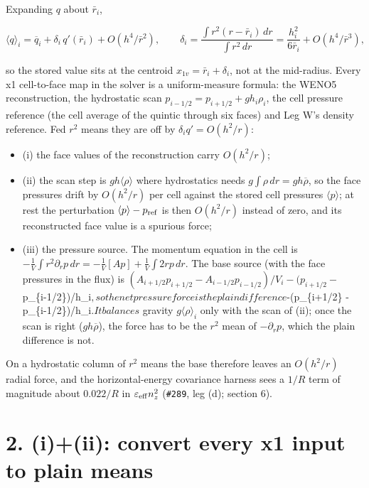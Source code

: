 \documentclass[11pt,a4paper]{article}
\begin{document}
Expanding $q$ about $\bar r_i$,

\begin{equation*}
\langle q\rangle_i = \overline{q}_i + \delta_i\, q'(\bar r_i) + O(h^4/\bar r^2), \qquad
\delta_i = \frac{\int r^2 (r-\bar r_i)\,dr}{\int r^2\,dr} = \frac{h_i^2}{6\bar r_i} + O(h^4/\bar r^3),
\end{equation*}

so the stored value sits at the centroid $x_{1v} = \bar r_i + \delta_i$, not at the mid-radius. Every x1
cell-to-face map in the solver is a uniform-measure formula: the WENO5 reconstruction, the hydrostatic scan
$p_{i-1/2} = p_{i+1/2} + g h_i \rho_i$, the cell pressure reference (the cell average of the quintic through
six faces) and Leg W's density reference. Fed $r^2$ means they are off by $\delta_i q' = O(h^2/r)$:

\begin{itemize}
\item (i) the face values of the reconstruction carry $O(h^2/r)$;
\item (ii) the scan step is $g h\langle\rho\rangle$ where hydrostatics needs $g\int\rho\,dr = g h\overline\rho$, so the
  face pressures drift by $O(h^2/r)$ per cell against the stored cell pressures $\langle p\rangle$; at rest the
  perturbation $\langle p\rangle - p_{\rm ref}$ is then $O(h^2/r)$ instead of zero, and its reconstructed face
  value is a spurious force;
\item (iii) the pressure source. The momentum equation in the cell is
  $-\frac{1}{V}\int r^2 \partial_r p\,dr = -\frac{1}{V}[A p] + \frac{1}{V}\int 2 r p\,dr$. The base source
  (with the face pressures in the flux) is $(A_{i+1/2}p_{i+1/2} - A_{i-1/2}p_{i-1/2})/V_i - (p_{i+1/2} -$
  p\_\{i-1/2\})/h\_i$, so the net pressure force is the plain difference $-(p\_\{i+1/2\} - p\_\{i-1/2\})/h\_i$. It balances$
  gravity $g\langle\rho\rangle_i$ only with the scan of (ii); once the scan is right ($g h\overline\rho$), the
  force has to be the $r^2$ mean of $-\partial_r p$, which the plain difference is not.
\end{itemize}

On a hydrostatic column of $r^2$ means the base therefore leaves an $O(h^2/r)$ radial force, and the
horizontal-energy covariance harness sees a $1/R$ term of magnitude about $0.022/R$ in $\varepsilon_{\rm eff} n_z^2$ (\texttt{\#289}, leg (d); section 6).

\section*{2. (i)+(ii): convert every x1 input to plain means}
\end{document}
